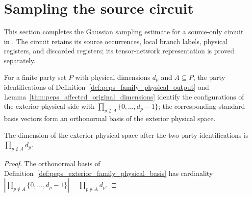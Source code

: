 \section{Sampling the source circuit}
\label{sec:peps_actual_source_sampling}

This section completes the Gaussian sampling estimate for a source-only circuit in
\cite[proof of Theorem 5.2]{OpenAI2026PolynomialPEPS}.
The circuit retains its source occurrences, local branch labels, physical registers,
and discarded registers; its tensor-network representation is proved separately.

\begin{definition}
    \label{def:peps_exterior_family_physical_basis}
    \leanok
    For a finite party set $P$ with physical dimensions $d_p$ and $A\subseteq P$,
    the party identifications of Definition~\ref{def:peps_family_physical_output}
    and Lemma~\ref{thm:peps_affected_original_dimensions} identify the
    configurations of the exterior physical side with
    $\prod_{p\notin A}\{0,\ldots,d_p-1\}$; the corresponding standard basis
    vectors form an orthonormal basis of the exterior physical space.
\end{definition}

\begin{lemma}
    \label{thm:peps_exterior_family_physical_dimension}
    \leanok
    The dimension of the exterior physical space after the two party
    identifications is $\prod_{p\notin A}d_p$.
\end{lemma}
\begin{proof}
    \leanok
    The orthonormal basis of Definition~\ref{def:peps_exterior_family_physical_basis}
    has cardinality $|\prod_{p\notin A}\{0,\ldots,d_p-1\}|=\prod_{p\notin A}d_p$.
\end{proof}

